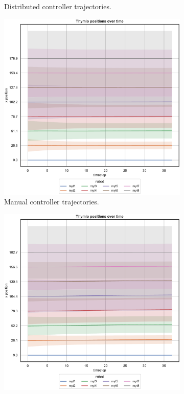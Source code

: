 \begin{figure}[H]
\begin{center}
\begin{subfigure}[h]{0.49\textwidth}
			\caption{Distributed controller trajectories.}
		\end{subfigure}
	\end{center}
	\begin{center}
		\begin{subfigure}[h]{0.49\textwidth}
			\centering			
			\includegraphics[width=.9\textwidth]{contents/images/net-d15/position-overtime-manual}%
			\caption{Manual controller trajectories.}
		\end{subfigure}
		\hfill
		\begin{subfigure}[h]{0.49\textwidth}
			\centering
			\includegraphics[width=.9\textwidth]{contents/images/net-d15/position-overtime-learned_distributed}

\end{subfigure}
\end{center}
\end{figure}
